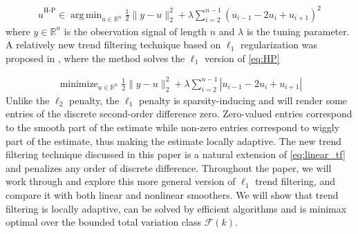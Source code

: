 \documentclass[a4paper]{article}
\DeclareMathOperator*{\argmin}{arg\,min}
\newcommand{\RR}{\mathbb{R}}
\renewcommand{\cal}{\mathcal}
\DeclareMathOperator*{\minimize}{minimize}
\begin{document}
\begin{align}
\hat{u}^{\text{H-P}} \in \argmin_{u\in\RR^n} \frac{1}{2}\|y-u\|_2^2 +\lambda\sum_{i=2}^{n-1}(u_{i-1}-2u_i+u_{i+1})^2
\label{eq:HP}
\end{align}
where $y\in\RR^n$ is the observation signal of length $n$ and $\lambda$ is the tuning parameter. A relatively new trend filtering technique based on $\ell_1$ regularization was proposed in \cite{kim2009ell_1}, where the method solves the $\ell_1$ version of \eqref{eq:HP}

\begin{align}
\minimize_{u\in\RR^n} \frac{1}{2}\|y-u\|_2^2 + \lambda\sum_{i=2}^{n-1} |u_{i-1} - 2u_i + u_{i+1}| \label{eq:linear_tf}
\end{align}
Unlike the $\ell_2$ penalty, the $\ell_1$ penalty is sparsity-inducing and will render some entries of the discrete second-order difference zero. Zero-valued entries correspond to the smooth part of the estimate while non-zero entries correspond to wiggly part of the estimate, thus making the estimate locally adaptive. The new trend filtering technique discussed in this paper is a natural extension of \eqref{eq:linear_tf} and penalizes any order of discrete difference. Throughout the paper, we will work through and explore this more general version of $\ell_1$ trend filtering, and compare it with both linear and nonlinear smoothers. We will show that trend filtering is locally adaptive, can be solved by efficient algorithms and is minimax optimal over the bounded total variation class $\cal{F}(k)$.
\end{document}
